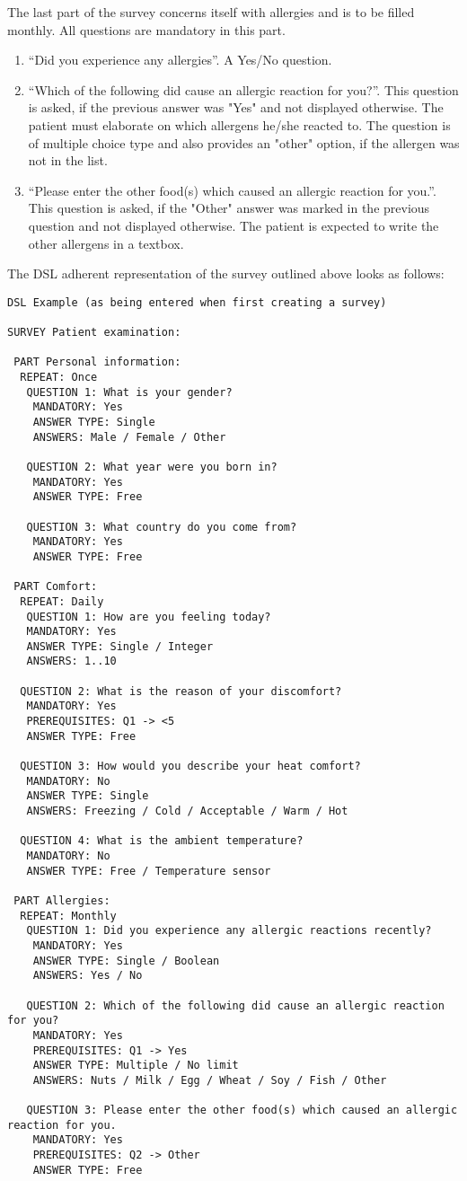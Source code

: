 The last part of the survey concerns itself with allergies and is to be filled monthly. All questions are mandatory in this part.

\begin{enumerate}
\item ``Did you experience any allergies''. A Yes/No question.
\item ``Which of the following did cause an allergic reaction for you?''. This question is asked, if the previous answer was "Yes" and not displayed otherwise. The patient must elaborate on which allergens he/she reacted to. The question is of multiple choice type and also provides an "other" option, if the allergen was not in the list.
\item ``Please enter the other food(s) which caused an allergic reaction for you.''. This question is asked, if the "Other" answer was marked in the previous question and not displayed otherwise. The patient is expected to write the other allergens in a textbox.
\end{enumerate}

The DSL adherent representation of the survey outlined above looks as follows:
\begin{verbatim}
DSL Example (as being entered when first creating a survey)

SURVEY Patient examination:

 PART Personal information:
  REPEAT: Once
   QUESTION 1: What is your gender?
    MANDATORY: Yes
    ANSWER TYPE: Single 
    ANSWERS: Male / Female / Other
      
   QUESTION 2: What year were you born in?
    MANDATORY: Yes
    ANSWER TYPE: Free

   QUESTION 3: What country do you come from?
    MANDATORY: Yes
    ANSWER TYPE: Free
      
 PART Comfort:
  REPEAT: Daily
   QUESTION 1: How are you feeling today?
   MANDATORY: Yes
   ANSWER TYPE: Single / Integer
   ANSWERS: 1..10
   
  QUESTION 2: What is the reason of your discomfort?
   MANDATORY: Yes
   PREREQUISITES: Q1 -> <5
   ANSWER TYPE: Free
 
  QUESTION 3: How would you describe your heat comfort?
   MANDATORY: No
   ANSWER TYPE: Single
   ANSWERS: Freezing / Cold / Acceptable / Warm / Hot
 
  QUESTION 4: What is the ambient temperature?
   MANDATORY: No
   ANSWER TYPE: Free / Temperature sensor
      
 PART Allergies:  
  REPEAT: Monthly
   QUESTION 1: Did you experience any allergic reactions recently?
    MANDATORY: Yes
    ANSWER TYPE: Single / Boolean
    ANSWERS: Yes / No
 
   QUESTION 2: Which of the following did cause an allergic reaction for you?
    MANDATORY: Yes
    PREREQUISITES: Q1 -> Yes
    ANSWER TYPE: Multiple / No limit
    ANSWERS: Nuts / Milk / Egg / Wheat / Soy / Fish / Other
 
   QUESTION 3: Please enter the other food(s) which caused an allergic reaction for you.
    MANDATORY: Yes
    PREREQUISITES: Q2 -> Other
    ANSWER TYPE: Free
\end{verbatim}

